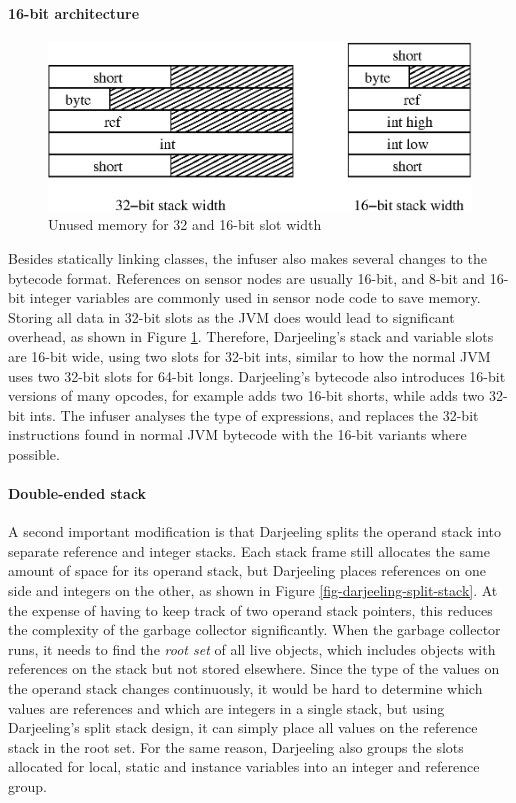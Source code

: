 \paragraph{16-bit architecture}
\begin{figure}
\centering
\includegraphics[width=0.6\linewidth]{32bit-vs-16bit-stack}
\caption{Unused memory for 32 and 16-bit slot width}
\label{fig-32bit-vs-16bit-stack}
\end{figure}

Besides statically linking classes, the infuser also makes several changes to the bytecode format. References on sensor nodes are usually 16-bit, and 8-bit and 16-bit integer variables are commonly used in sensor node code to save memory. Storing all data in 32-bit slots as the JVM does would lead to significant overhead, as shown in Figure \ref{fig-32bit-vs-16bit-stack}. Therefore, Darjeeling's stack and variable slots are 16-bit wide, using two slots for 32-bit ints, similar to how the normal JVM uses two 32-bit slots for 64-bit longs. Darjeeling's bytecode also introduces 16-bit versions of many opcodes, for example  adds two 16-bit shorts, while  adds two 32-bit ints. The infuser analyses the type of expressions, and replaces the 32-bit instructions found in normal JVM bytecode with the 16-bit variants where possible.



\paragraph{Double-ended stack}
A second important modification is that Darjeeling splits the operand stack into separate reference and integer stacks. Each stack frame still allocates the same amount of space for its operand stack, but Darjeeling places references on one side and integers on the other, as shown in Figure \ref{fig-darjeeling-split-stack}. At the expense of having to keep track of two operand stack pointers, this reduces the complexity of the garbage collector significantly. When the garbage collector runs, it needs to find the \emph{root set} of all live objects, which includes objects with references on the stack but not stored elsewhere. Since the type of the values on the operand stack changes continuously, it would be hard to determine which values are references and which are integers in a single stack, but using Darjeeling's split stack design, it can simply place all values on the reference stack in the root set. For the same reason, Darjeeling also groups the slots allocated for local, static and instance variables into an integer and reference group.

